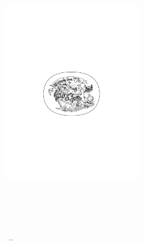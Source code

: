 \documentclass[ twoside,openright,titlepage,numbers=noenddot,%
headinclude,footinclude,cleardoublepage=empty,abstract=on,
BCOR=5mm,paper=a4,fontsize=11pt, dvipsnames
]{scrreprt}
\begin{document}
\frenchspacing
\raggedbottom
{} %
\pagestyle{plain}

\thispagestyle{empty}
\begin{center}
    \spacedlowsmallcaps{\myName} \\ \medskip

    \begingroup
    \color{CTtitle}\spacedallcaps{\myTitle}\\ \bigskip
    \mySubtitle \\ \medskip
    \endgroup
\end{center}

\begin{titlepage}
    \begin{addmargin}[-1cm]{-3cm}
    \begin{center}
        \large

        \hfill

        \vfill

        \begingroup
        \color{CTtitle}\spacedallcaps{\myTitle} \\ \bigskip
        \mySubtitle \\ \medskip
        \endgroup

        \spacedlowsmallcaps{\myName}

        \vfill

        \includegraphics[width=6cm]{gfx/TFZsuperellipse_bw} \\ \medskip

        \myDepartment \\
        \myFaculty \\
        \myUni \\ \bigskip

        \myTime\ -- \myVersion

        \vfill

    \end{center}
  \end{addmargin}
\end{titlepage}
\end{document}
